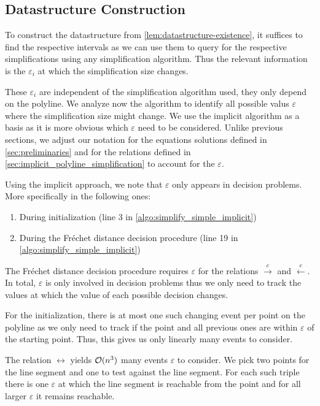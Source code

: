 \subsection{Datastructure Construction}
\label{ssec:ds-construction}

To construct the datastructure from \cref{lem:datastructure-existence}, it suffices to find the respective intervals as we can use them to query for the respective simplifications using any simplification algorithm. Thus the relevant information is the \(\varepsilon_i\) at which the simplification size changes.

These \(\varepsilon_i\) are independent of the simplification algorithm used, they only depend on the polyline. We analyze now the \citeauthor{on_optimal_polyline_simplification_using_the_hausdorff_and_frechet_distance} algorithm to identify all possible valus \(\varepsilon\) where the simplification size might change. We use the implicit algorithm as a basis as it is more obvious which \(\varepsilon\) need to be considered. Unlike previous sections, we adjust our notation for the equations solutions defined in \cref{sec:preliminaries} and for the relations defined in \cref{sec:implicit_polyline_simplification} to account for the \(\varepsilon\).

Using the implicit approach, we note that \(\varepsilon\) only appears in decision problems. More specifically in the following ones:
\begin{enumerate}
  \item During initialization (line 3 in \cref{algo:simplify_simple_implicit})
	\item During the Fréchet distance decision procedure (line 19 in \cref{algo:simplify_simple_implicit})
\end{enumerate}

The Fréchet distance decision procedure requires \(\varepsilon\) for the relations \(\overset e\rightarrow\) and \(\overset e\leftarrow\). In total, \(\varepsilon\) is only involved in decision problems thus we only need to track the values at which the value of each possible decision changes. 

For the initialization, there is at most one such changing event per point on the polyline as we only need to track if the point and all previous ones are within \(\varepsilon\) of the starting point. Thus, this gives us only linearly many events to consider.

The relation \(\leftrightarrow\) yields \(\mathcal{O}(n^3)\) many events \(\varepsilon\) to consider. We pick two points for the line segment and one to test against the line segment. For each such triple there is one \(\varepsilon\) at which the line segment is reachable from the point and for all larger \(\varepsilon\) it remains reachable. 

